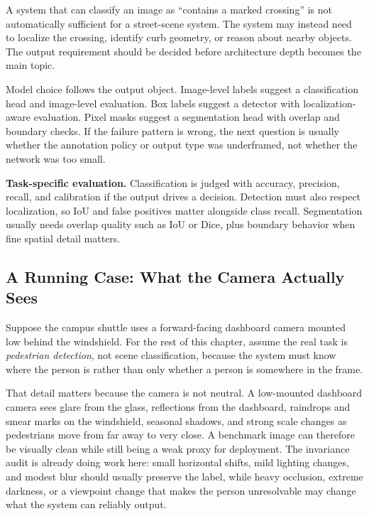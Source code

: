 \begin{example}
A system that can classify an image as ``contains a marked crossing'' is not automatically sufficient for a street-scene system. The system may instead need to localize the crossing, identify curb geometry, or reason about nearby objects. The output requirement should be decided before architecture depth becomes the main topic.
\end{example}

\begin{practicalnote}
Model choice follows the output object. Image-level labels suggest a classification head and image-level evaluation. Box labels suggest a detector with localization-aware evaluation. Pixel masks suggest a segmentation head with overlap and boundary checks. If the failure pattern is wrong, the next question is usually whether the annotation policy or output type was underframed, not whether the network was too small.
\end{practicalnote}

\begin{thinkingtool}
\textbf{Task-specific evaluation.} Classification is judged with accuracy, precision, recall, and calibration if the output drives a decision. Detection must also respect localization, so IoU and false positives matter alongside class recall. Segmentation usually needs overlap quality such as IoU or Dice, plus boundary behavior when fine spatial detail matters.
\end{thinkingtool}

\subsection{A Running Case: What the Camera Actually Sees}

Suppose the campus shuttle uses a forward-facing dashboard camera mounted low behind the windshield. For the rest of this chapter, assume the real task is \emph{pedestrian detection}, not scene classification, because the system must know where the person is rather than only whether a person is somewhere in the frame.

That detail matters because the camera is not neutral. A low-mounted dashboard camera sees glare from the glass, reflections from the dashboard, raindrops and smear marks on the windshield, seasonal shadows, and strong scale changes as pedestrians move from far away to very close. A benchmark image can therefore be visually clean while still being a weak proxy for deployment. The invariance audit is already doing work here: small horizontal shifts, mild lighting changes, and modest blur should usually preserve the label, while heavy occlusion, extreme darkness, or a viewpoint change that makes the person unresolvable may change what the system can reliably output.

